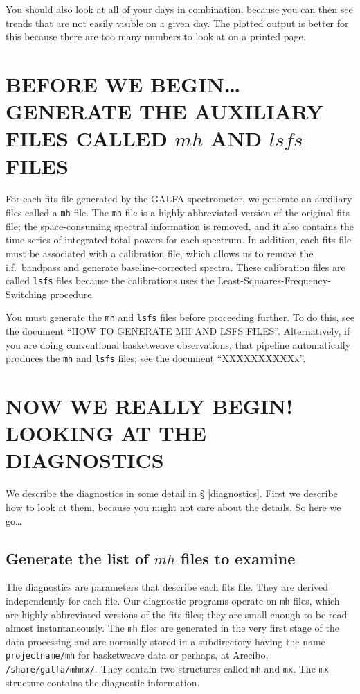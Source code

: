 \documentclass[psfig,preprint]{aastex}
\begin{document}
	You should also look at all of your days in combination, because
you can then see trends that are not easily visible on a given day. The
plotted output is better for this because there are too many numbers to
look at on a printed page.

\section{BEFORE WE BEGIN\dots GENERATE THE AUXILIARY FILES CALLED $mh$
AND $lsfs$ FILES}

	For each fits file generated by the GALFA spectrometer, we generate
an auxiliary files called a \verb$mh$ file. The \verb$mh$ file is a
highly abbreviated version of the original fits file; the
space-consuming spectral information is removed, and it also contains
the time series of integrated total powers for each spectrum. In
addition, each fits file must be associated with a calibration file,
which allows us to remove the i.f.\ bandpass and generate 
baseline-corrected spectra. These calibration files are called
\verb$lsfs$ files because the calibrations uses the
Least-Squaares-Frequency-Switching procedure. 

	You must generate the \verb$mh$ and \verb$lsfs$ files before
proceeding further. To do this, see the document ``HOW TO GENERATE MH AND
LSFS FILES''. Alternatively, if you are doing conventional basketweave
observations, that pipeline automatically produces the \verb$mh$ and
\verb$lsfs$ files; see the document ``XXXXXXXXXXx''.


\section{NOW WE REALLY BEGIN! LOOKING AT THE DIAGNOSTICS} \label{looking}

	We describe the diagnostics in some detail in \S
\ref{diagnostics}. First we describe how to look at them, because you
might not care about the details. So here we go\dots

\subsection{Generate the list of $mh$ files to examine}

	The diagnostics are parameters that describe each fits file. 
They are derived independently for each file.  Our diagnostic programs
operate on \verb$mh$ files, which are highly abbreviated versions of the
fits files; they are small enough to be read almost instantaneously. 
The \verb$mh$ files are generated in the very first stage of the data
processing and are normally stored in a subdirectory having the name
\verb$projectname/mh$ for basketweave data or perhaps, at Arecibo,
\verb$/share/galfa/mhmx/$.  They contain two structures called \verb$mh$
and \verb$mx$.  The \verb$mx$ structure contains the diagnostic
information. 
\end{document}
